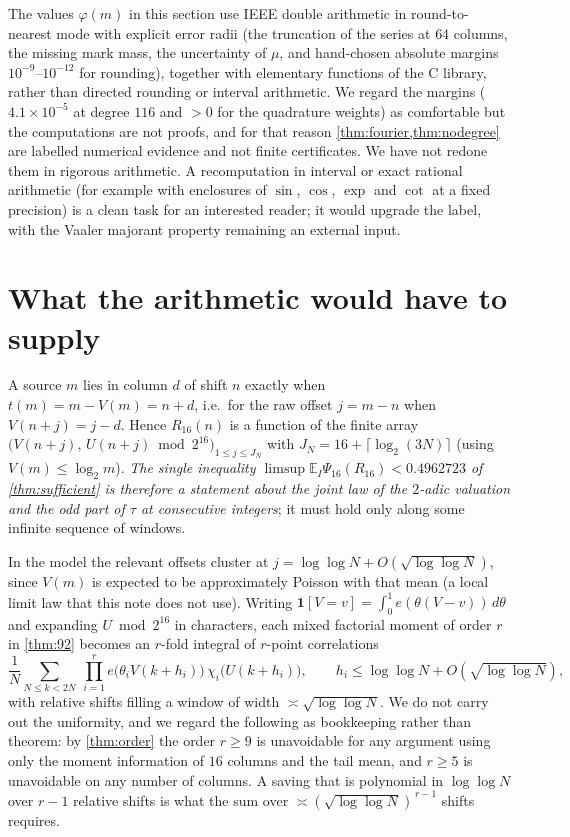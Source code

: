 \documentclass[11pt]{article}
\newcommand{\Av}{\mathbb E}
\newcommand{\ind}{\mathbf 1}
\begin{document}
\begin{remark}\label{rem:float}
The values $\varphi(m)$ in this section use IEEE double arithmetic in round-to-nearest mode with explicit error radii (the truncation of the series at $64$ columns, the missing mark mass, the uncertainty of $\mu$, and hand-chosen absolute margins $10^{-9}$--$10^{-12}$ for rounding), together with elementary functions of the C library, rather than directed rounding or interval arithmetic. We regard the margins ($4.1\times10^{-5}$ at degree $116$ and $>0$ for the quadrature weights) as comfortable but the computations are not proofs, and for that reason \cref{thm:fourier,thm:nodegree} are labelled numerical evidence and not finite certificates. We have not redone them in rigorous arithmetic. A recomputation in interval or exact rational arithmetic (for example with enclosures of $\sin$, $\cos$, $\exp$ and $\cot$ at a fixed precision) is a clean task for an interested reader; it would upgrade the label, with the Vaaler majorant property remaining an external input.
\end{remark}

\section{What the arithmetic would have to supply}\label{sec:arith}

A source $m$ lies in column $d$ of shift $n$ exactly when $t(m)=m-V(m)=n+d$, i.e.\ for the raw offset $j=m-n$ when $V(n+j)=j-d$. Hence $R_{16}(n)$ is a function of the finite array $\bigl(V(n+j),\,U(n+j)\bmod2^{16}\bigr)_{1\le j\le J_N}$ with $J_N=16+\lceil\log_2(3N)\rceil$ (using $V(m)\le\log_2 m$). \emph{The single inequality $\limsup\Av_I\Psi_{16}(R_{16})<0.4962723$ of \cref{thm:sufficient} is therefore a statement about the joint law of the $2$-adic valuation and the odd part of $\tau$ at consecutive integers}; it must hold only along some infinite sequence of windows.

In the model the relevant offsets cluster at $j=\log\log N+O(\sqrt{\log\log N})$, since $V(m)$ is expected to be approximately Poisson with that mean (a local limit law that this note does not use). Writing $\ind[V=v]=\int_0^1e(\theta(V-v))\,d\theta$ and expanding $U\bmod2^{16}$ in characters, each mixed factorial moment of order $r$ in \cref{thm:92} becomes an $r$-fold integral of $r$-point correlations
\[
\frac1N\sum_{N\le k<2N}\ \prod_{i=1}^{r}e\bigl(\theta_iV(k+h_i)\bigr)\,\chi_i\bigl(U(k+h_i)\bigr),\qquad h_i\le\log\log N+O(\sqrt{\log\log N}),
\]
with relative shifts filling a window of width $\asymp\sqrt{\log\log N}$. We do not carry out the uniformity, and we regard the following as bookkeeping rather than theorem: by \cref{thm:order} the order $r\ge9$ is unavoidable for any argument using only the moment information of $16$ columns and the tail mean, and $r\ge5$ is unavoidable on any number of columns. A saving that is polynomial in $\log\log N$ over $r-1$ relative shifts is what the sum over $\asymp(\sqrt{\log\log N})^{\,r-1}$ shifts requires.
\end{document}
